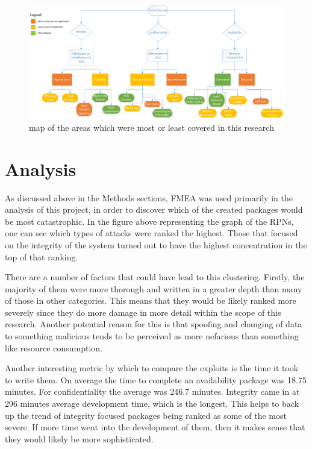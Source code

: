 \documentclass[IEEEtran,letterpaper,10pt,notitlepage,draftclsnofoot]{article}
\begin{document}
\begin{figure}[H]
    \centering
    \includegraphics[width=\textwidth]{color_model.eps}
    \caption{map of the areas which were most or least covered in this research}
\end{figure}

\section{Analysis}
As discussed above in the Methods sections, FMEA was used primarily in the analysis of this project, in order to discover which of the created packages would be most catastrophic. 
In the figure above representing the graph of the RPNs, one can see which types of attacks were ranked the highest. 
Those that focused on the integrity of the system turned out to have the highest concentration in the top of that ranking.

There are a number of factors that could have lead to this clustering.
Firstly, the majority of them were more thorough and written in a greater depth than many of those in other categories.
This means that they would be likely ranked more severely since they do more damage in more detail within the scope of this research.
Another potential reason for this is that spoofing and changing of data to something malicious tends to be perceived as more nefarious than something like resource consumption.

Another interesting metric by which to compare the exploits is the time it took to write them.
On average the time to complete an availability package was 18.75 minutes.
For confidentiality the average was 246.7 minutes.
Integrity came in at 296 minutes average development time, which is the longest.
This helps to back up the trend of integrity focused packages being ranked as some of the most severe.
If more time went into the development of them, then it makes sense that they would likely be more sophisticated.
\end{document}

